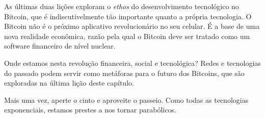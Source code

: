 As últimas duas lições exploram o \textit{ethos} do desenvolvimento tecnológico no Bitcoin, que é indiscutivelmente tão importante quanto a própria tecnologia. O Bitcoin não é o próximo aplicativo revolucionário no seu celular. É a base de uma nova realidade econômica, razão pela qual o Bitcoin deve ser tratado como um software financeiro de nível nuclear.

Onde estamos nesta revolução financeira, social e tecnológica? Redes e tecnologias do passado podem servir como metáforas para o futuro dos Bitcoins, que são exploradas na última lição deste capítulo.

Mais uma vez, aperte o cinto e aproveite o passeio. Como todas as tecnologias exponenciais, estamos prestes a nos tornar parabólicos.